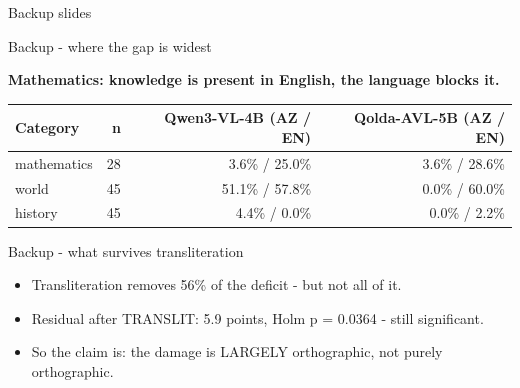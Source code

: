 \documentclass[aspectratio=169,12pt]{beamer}
\begin{document}
\appendix
\begin{frame}
  \begin{center}{\Large Backup slides}\end{center}
\end{frame}

\begin{frame}{Backup - where the gap is widest}
\begin{center}{\large\bfseries Mathematics: knowledge is present in English, the language blocks it.}\end{center}
\vspace{0.3cm}
\begin{center}
\begin{tabular}{lrrr}
\toprule
\textbf{Category} & \textbf{n} & \textbf{Qwen3-VL-4B (AZ / EN)} & \textbf{Qolda-AVL-5B (AZ / EN)} \\
\midrule
mathematics & 28 & 3.6\% / 25.0\% & 3.6\% / 28.6\% \\
world & 45 & 51.1\% / 57.8\% & 0.0\% / 60.0\% \\
history & 45 & 4.4\% / 0.0\% & 0.0\% / 2.2\% \\
\bottomrule
\end{tabular}
\end{center}
\vspace{0.3cm}
\end{frame}

\begin{frame}{Backup - what survives transliteration}
\begin{itemize}
  \item[] Transliteration removes 56\% of the deficit - but not all of it.
\vspace{0.25cm}
  \item[] Residual after TRANSLIT: 5.9 points, Holm p = 0.0364 - still significant.
\vspace{0.25cm}
  \item[] So the claim is: the damage is LARGELY orthographic, not purely orthographic.
\end{itemize}
\end{frame}
\end{document}
